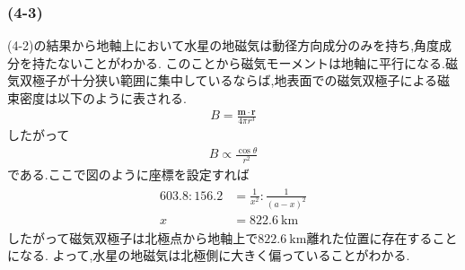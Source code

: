 \subsubsection*{(4-3)}
(4-2)の結果から地軸上において水星の地磁気は動径方向成分のみを持ち,角度成分を持たないことがわかる.
このことから磁気モーメントは地軸に平行になる.磁気双極子が十分狭い範囲に集中しているならば,地表面での磁気双極子による磁束密度は以下のように表される.
\begin{align}
  B=\frac{{\bm m}\cdot{\bm r}}{4\pi r^3}
\end{align}
したがって
\begin{align}
  B\propto\frac{\cos\theta}{r^2}
\end{align}
である.ここで図のように座標を設定すれば
\begin{align}
  \begin{split}
    603.8:156.2&=\frac{1}{x^2}:\frac{1}{(a-x)^2}\\
    x&=822.6\ \si{\kilo\metre}
  \end{split}
\end{align}
したがって磁気双極子は北極点から地軸上で$822.6\ \si{\kilo\metre}$離れた位置に存在することになる.
よって,水星の地磁気は北極側に大きく偏っていることがわかる.
